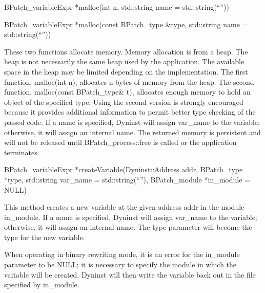 \begin{apient}
BPatch_variableExpr *malloc(int n, std::string name = std::string(“”))

BPatch_variableExpr *malloc(const BPatch_type &type, std::string name = std::string(“”))
\end{apient}

\begin{apidesc}
These two functions allocate memory. Memory allocation is from a heap. The heap is not necessarily the same heap used by
the application. The available space in the heap may be limited depending on the implementation. The first function,
malloc(int n), allocates n bytes of memory from the heap. The second function, malloc(const BPatch_type& t),
allocates enough memory to hold an object of the specified type. Using the second version is strongly encouraged
because it provides additional information to permit better type checking of the passed code. If a name is specified,
Dyninst will assign var_name to the variable; otherwise, it will assign an internal name. The returned memory is
persistent and will not be released until BPatch_process::free is called or the application terminates.
\end{apidesc}

\begin{apient}
BPatch_variableExpr *createVariable(Dyninst::Address addr, BPatch_type *type, std::string var_name = std::string(“”), BPatch_module *in_module = NULL)
\end{apient}

\begin{apidesc}
This method creates a new variable at the given address addr in the module in_module. If a name is specified, Dyninst
will assign var_name to the variable; otherwise, it will assign an internal name. The type parameter will become the
type for the new variable.

When operating in binary rewriting mode, it is an error for the in_module parameter to be NULL; it is necessary to
specify the module in which the variable will be created. Dyninst will then write the variable back out in the file
specified by in_module.
\end{apidesc}

